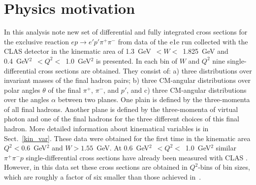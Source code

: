 \chapter{Physics motivation}
\label{motivation}

In this analysis note new set of differential and fully integrated cross sections for the exclusive reaction
 $ep \to e'p' \pi^+ \pi^-$ from data of the e1e run collected with the CLAS detector in the kinematic area of 
1.3~GeV~$< W <$~1.825~GeV and 0.4~GeV$^{2}$~$< Q^{2} <$~1.0~GeV$^{2}$ is presented. In each bin of $W$ and $Q^2$ nine single-differential cross sections are obtained. They consist of: a) three distributions over invariant masses of the final hadron pairs; b) three CM-angular distributions over polar angles $\theta$ of the final $\pi^+$, $\pi^-$, and $p'$, and c) three CM-angular distributions over the angles $\alpha$ between two planes. One plain is defined by the three-momenta of all final hadrons. Another plane is defined by the three-momenta of virtual photon and one of the final hadrons for the three different choices of this final hadron.
More detailed information about kinematical variables is in Sect.~\ref{kin_var}.
These data were obtained for the first time in the kinematic area $Q^{2} < 0.6$~GeV$^{2}$ and $W > 1.55$~GeV. At 0.6~GeV$^{2}$~$< Q^{2} <$~1.0~GeV$^{2}$  similar $\pi^+\pi^-p$ single-differential cross sections have already been measured with CLAS \cite{Ripani:2002ss}. However, in this data set these cross sections are obtained  in $Q^2$-bins of bin sizes, which are roughly a factor of six smaller than those achieved in~\cite{Ripani:2002ss}. 


